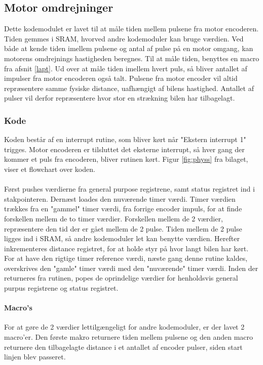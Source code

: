 \newpage

\subsection{Motor omdrejninger}
Dette kodemodulet er lavet til at måle tiden mellem pulsene fra motor encoderen. Tiden gemmes i SRAM, hvorved andre kodemoduler kan bruge værdien. Ved både at kende tiden imellem pulsene og antal af pulse på en motor omgang, kan motorens omdrejnings hastigheden beregnes. Til at måle tiden, benyttes en macro fra afsnit \ref{lapt}. Ud over at måle tiden imellem hvert puls, så bliver antallet af impulser fra motor encoderen også talt. Pulsene fra motor encoder vil altid repræsentere samme fysiske distance, uafhængigt af bilens hastighed. Antallet af pulser vil derfor repræsentere hvor stor en strækning bilen har tilbagelagt.

\subsubsection{Kode}
Koden består af en interrupt rutine, som bliver kørt når "Ekstern interrupt 1" trigges. Motor encoderen er tilsluttet det eksterne interrupt, så hver gang der kommer et puls fra encoderen, bliver rutinen kørt. Figur \ref{fig:physs} fra bilaget, viser et flowchart over koden.\\
\\
Først pushes værdierne fra general purpose registrene, samt status registret ind i stakpointeren. Dernæst loades den nuværende timer værdi. Timer værdien trækkes fra en "gammel" timer værdi, fra forrige encoder impuls, for at finde forskellen mellem de to timer værdier. Forskellen mellem de 2 værdier, repræsentere den tid der er gået mellem de 2 pulse. Tiden mellem de 2 pulse ligges ind i SRAM, så andre kodemoduler let kan benytte værdien. Herefter inkrementeres distance registret, for at holde styr på hvor langt bilen har kørt. For at have den rigtige timer reference værdi, næste gang denne rutine kaldes, overskrives den "gamle" timer værdi med den "nuværende" timer værdi. Inden der returneres fra rutinen, popes de oprindelige værdier for henholdsvis general purpus registrene og status registret.

\paragraph{Macro's}

For at gøre de 2 værdier lettilgængeligt for andre kodemoduler, er der lavet 2 macro'er. Den første makro returnere tiden mellem pulsene og den anden macro returnere den tilbagelagte distance i et antallet af encoder pulser, siden start linjen blev passeret.
